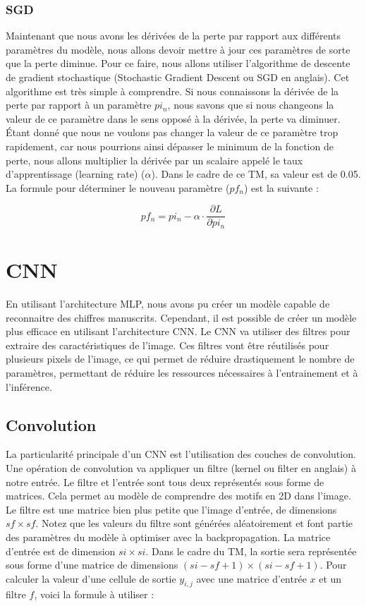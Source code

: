 \documentclass{article}
\begin{document}
\subsubsection{SGD}

Maintenant que nous avons les dérivées de la perte par rapport aux différents paramètres du modèle, nous allons devoir mettre à jour ces paramètres de sorte que la perte diminue. Pour ce faire, nous allons utiliser l'algorithme de descente de gradient stochastique (Stochastic Gradient Descent ou SGD en anglais). Cet algorithme est très simple à comprendre. Si nous connaissons la dérivée de la perte par rapport à un paramètre $pi_n$, nous savons que si nous changeons la valeur de ce paramètre dans le sens opposé à la dérivée, la perte va diminuer. Étant donné que nous ne voulons pas changer la valeur de ce paramètre trop rapidement, car nous pourrions ainsi dépasser le minimum de la fonction de perte, nous allons multiplier la dérivée par un scalaire appelé le taux d'apprentissage (learning rate) ($\alpha$). Dans le cadre de ce TM, sa valeur est de 0.05. La formule pour déterminer le nouveau paramètre ($pf_n$) est la suivante :

\[
pf_n = pi_n - \alpha \cdot \frac{\partial L}{\partial pi_n}
\]

\section{CNN}

En utilisant l'architecture MLP, nous avons pu créer un modèle capable de reconnaitre des chiffres manuscrits. Cependant, il est possible de créer un modèle plus efficace en utilisant l'architecture CNN. Le CNN va utiliser des filtres pour extraire des caractéristiques de l'image. Ces filtres vont être réutilisés pour plusieurs pixels de l'image, ce qui permet de réduire drastiquement le nombre de paramètres, permettant de réduire les ressources nécessaires à l'entrainement et à l'inférence.

\subsection{Convolution}

La particularité principale d'un CNN est l'utilisation des couches de convolution. Une opération de convolution va appliquer un filtre (kernel ou filter en anglais) à notre entrée. Le filtre et l'entrée sont tous deux représentés sous forme de matrices. Cela permet au modèle de comprendre des motifs en 2D dans l'image. Le filtre est une matrice bien plus petite que l'image d'entrée, de dimensions $sf \times sf$. Notez que les valeurs du filtre sont générées aléatoirement et font partie des paramètres du modèle à optimiser avec la backpropagation. La matrice d'entrée est de dimension $si \times si$. Dans le cadre du TM, la sortie sera représentée sous forme d'une matrice de dimensions $(si - sf + 1) \times (si - sf + 1)$. Pour calculer la valeur d'une cellule de sortie $y_{i,j}$ avec une matrice d'entrée $x$ et un filtre $f$, voici la formule à utiliser :
\end{document}
